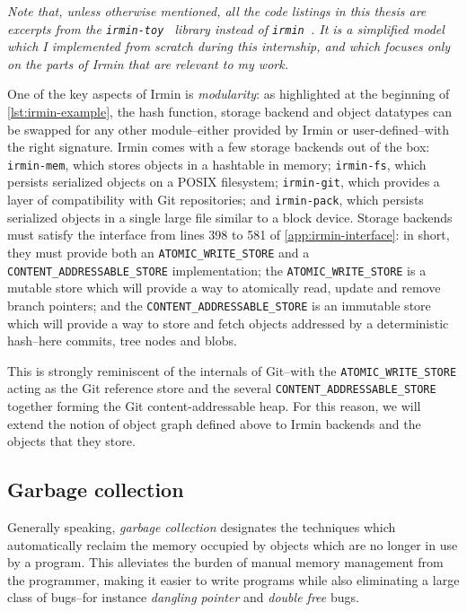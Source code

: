 \vspace{-.5em}

\vspace{-1em}

\textit{Note that, unless otherwise mentioned, all the code listings in this thesis are excerpts from the \texttt{irmin-toy}~\cite{irmin-toy-github} library instead of \texttt{irmin}~\cite{irmin-github}. It is a simplified model which I implemented from scratch during this internship, and which focuses only on the parts of Irmin that are relevant to my work.}

\bigskip
One of the key aspects of Irmin is \emph{modularity}: as highlighted at the beginning of \cref{lst:irmin-example}, the hash function, storage backend and object datatypes can be swapped for any other module--either provided by Irmin or user-defined--with the right signature. Irmin comes with a few storage backends out of the box: \texttt{irmin-mem}, which stores objects in a hashtable in memory; \texttt{irmin-fs}, which persists serialized objects on a POSIX filesystem; \texttt{irmin-git}, which provides a layer of compatibility with Git repositories; and \texttt{irmin-pack}, which persists serialized objects in a single large file similar to a block device. Storage backends must satisfy the interface from lines 398 to 581 of \cref{app:irmin-interface}: in short, they must provide both an \texttt{ATOMIC\_WRITE\_STORE} and a \texttt{CONTENT\_ADDRESSABLE\_STORE} implementation; the \texttt{ATOMIC\_WRITE\_STORE} is a mutable store which will provide a way to atomically read, update and remove branch pointers; and the \texttt{CONTENT\_ADDRESSABLE\_STORE} is an immutable store which will provide a way to store and fetch objects addressed by a deterministic hash--here commits, tree nodes and blobs.

\bigskip
This is strongly reminiscent of the internals of Git--with the \texttt{ATOMIC\_WRITE\_STORE} acting as the Git reference store and the several \texttt{CONTENT\_ADDRESSABLE\_STORE} together forming the Git content-addressable heap. For this reason, we will extend the notion of object graph defined above to Irmin backends and the objects that they store.

\subsection{Garbage collection}

Generally speaking, \emph{garbage collection} designates the techniques which automatically reclaim the memory occupied by objects which are no longer in use by a program. This alleviates the burden of manual memory management from the programmer, making it easier to write programs while also eliminating a large class of bugs--for instance \emph{dangling pointer} and \emph{double free} bugs.

